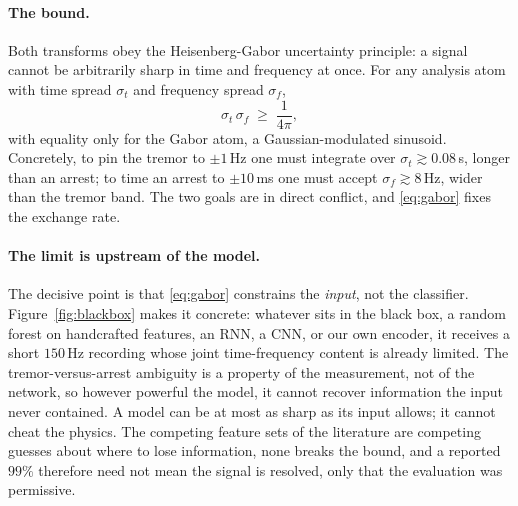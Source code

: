 \documentclass{article}
\begin{document}
\paragraph{The bound.}
Both transforms obey the Heisenberg-Gabor uncertainty principle: a signal cannot be
arbitrarily sharp in time and frequency at once. For any analysis atom with
time spread $\sigma_t$ and frequency spread $\sigma_f$,
\begin{equation}
\sigma_t\,\sigma_f \;\ge\; \frac{1}{4\pi},
\label{eq:gabor}
\end{equation}
with equality only for the Gabor atom, a Gaussian-modulated sinusoid. Concretely, to
pin the tremor to $\pm1$\,Hz one must integrate over $\sigma_t\gtrsim 0.08$\,s, longer
than an arrest; to time an arrest to $\pm10$\,ms one must accept
$\sigma_f\gtrsim 8$\,Hz, wider than the tremor band. The two goals are in direct
conflict, and \eqref{eq:gabor} fixes the exchange rate.

\paragraph{The limit is upstream of the model.}
The decisive point is that \eqref{eq:gabor} constrains the \emph{input}, not the
classifier. Figure~\ref{fig:blackbox} makes it concrete: whatever sits in the black
box, a random forest on handcrafted features, an RNN, a CNN, or our own encoder, it
receives a short $150$\,Hz recording whose joint time-frequency content is already
limited. The tremor-versus-arrest ambiguity is a property of the measurement, not of
the network, so however powerful the model, it cannot recover information the input
never contained. A model can be at most as sharp as its input allows; it cannot cheat
the physics. The competing feature sets of the literature are competing guesses about
where to lose information, none breaks the bound, and a reported $99\%$ therefore need
not mean the signal is resolved, only that the evaluation was permissive.
\end{document}
